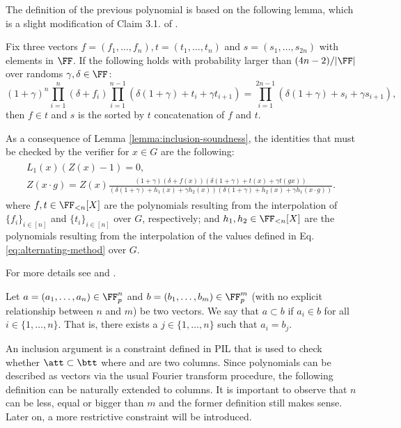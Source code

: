 The definition of the previous polynomial is based on the following lemma, which is a slight modification of Claim 3.1. of \cite{EPRINT:GabWil20}.
\begin{lemma}\label{lemma:inclusion-soundness}
  Fix three vectors $f = (f_1, \dots, f_n),t = (t_1, \dots, t_n)$ and $s = (s_1,\dots,s_{2n})$ with elements in $\FF$. If the following holds with probability larger than $(4n-2)/|\FF|$ over randoms $\gamma, \delta \in \FF$:
  \begin{equation*}
    (1+\gamma)^n\prod_{i=1}^n (\delta + f_i)\prod_{i=1}^{n-1} (\delta(1+\gamma) + t_i + \gamma t_{i+1}) = \prod_{i=1}^{2n-1} (\delta(1+\gamma) + s_i + \gamma s_{i+1}),
  \end{equation*}
  then $f \in t$ and $s$ is the sorted by $t$ concatenation of $f$ and $t$. 
\end{lemma}

As a consequence of Lemma \ref{lemma:inclusion-soundness}, the identities that must be checked by the verifier for $x \in G$ are the following: 
\begin{align*}
\begin{array}{c}
  L_1(x) \left( Z(x) - 1\right) = 0, \\[0.2cm]
  Z(x\cdot g) = \displaystyle Z(x)\frac{(1+\gamma)(\delta + f(x))(\delta(1+\gamma) + t(x) + \gamma t(gx))}{(\delta(1+\gamma) + {h_1}(x) + \gamma {h_2}(x))(\delta(1+\gamma) + {h_2}(x) + \gamma {h_1}(x\cdot g))}.
\end{array}
\end{align*}
where $f,t \in \FF_{<n}[X]$ are the polynomials resulting from the interpolation of $\{f_i\}_{i\in[n]}$ and $\{t_i\}_{i\in[n]}$ over $G$, respectively; and $h_1,h_2 \in \FF_{<n}[X]$ are the polynomials resulting from the interpolation of the values defined in Eq. \eqref{eq:alternating-method} over $G$.

For more details see \cite{EPRINT:GabWil20} and \cite{EPRINT:PFMBM22}.

\begin{definition}
Let $a = (a_1, \dots, a_n) \in \FF_p^n$ and $b = (b_1, \dots, b_m) \in \FF_p^m$ (with no explicit relationship between $n$ and $m$) be two vectors. We say that $a \subset b$ if $a_i \in b$ for all $i \in \{1, \dots, n\}$. That is, there exists a $j \in \{1, \dots, n\}$ such that $a_i = b_j$. 
\end{definition}

An inclusion argument is a constraint defined in PIL that is used to check whether $\att \subset \btt$ where \att and \btt are two columns. Since polynomials can be described as vectors via the usual Fourier transform procedure, the following definition can be naturally extended to columns. It is important to observe that $n$ can be less, equal or bigger than $m$ and the former definition still makes sense. Later on, a more restrictive constraint will be introduced.


